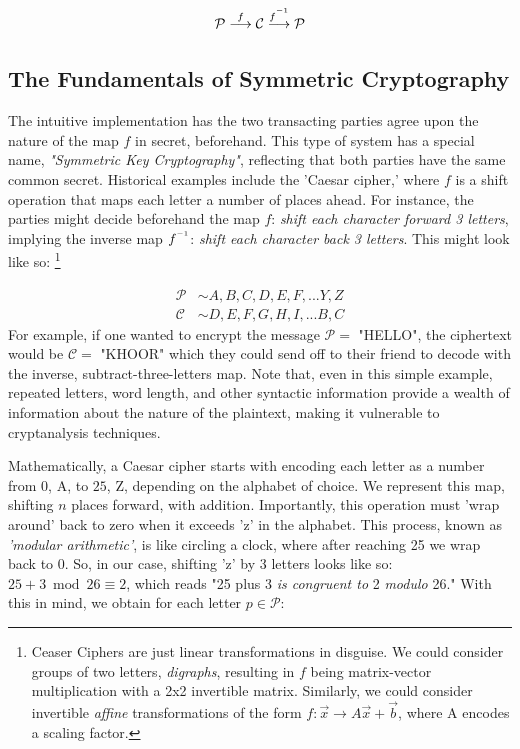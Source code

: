 \documentclass[11pt, a4paper]{report}
\newcommand{\inv}{^{\raisebox{.2em}{$\scriptscriptstyle-1$}}}
\begin{document}
$$ \mathcal{P} \overset{f}\longrightarrow \mathcal{C} \overset{f\inv}\longrightarrow \mathcal{P} $$

\subsection{The Fundamentals of Symmetric Cryptography}

The intuitive implementation has the two transacting parties agree upon the nature of the map $f$ in secret, beforehand. This type of system has a special name, \textit{"Symmetric Key Cryptography"}, reflecting that both parties have the same common secret. Historical examples include the 'Caesar cipher,' where $f$ is a shift operation that maps each letter a number of places ahead. For instance, the parties might decide beforehand the map $f$: \textit{shift each character forward 3 letters}, implying the inverse map $f\inv$: \textit{shift each character back 3 letters}. This might look like so: \footnote{Ceaser Ciphers are just linear transformations in disguise. We could consider groups of two letters, \textit{digraphs}, resulting in $f$ being matrix-vector multiplication with a 2x2 invertible matrix. Similarly, we could consider invertible \textit{affine} transformations of the form $f:\vec{x} \to A\vec{x} + \vec{b}$, where A encodes a scaling factor.}

\begin{align*}
 \mathcal{P} &\sim A,B,C,D,E,F,...Y,Z  \\ 
 \mathcal{C} &\sim D,E,F,G,H,I,...B,C 
\end{align*} %
For example, if one wanted to encrypt the message $\mathcal{P} =$ "HELLO", the ciphertext would be $\mathcal{C} =$ "KHOOR" which they could send off to their friend to decode with the inverse, subtract-three-letters map. Note that, even in this simple example, repeated letters, word length, and other syntactic information provide a wealth of information about the nature of the plaintext, making it vulnerable to cryptanalysis techniques.\autocite[56]{koblitz} 

Mathematically, a Caesar cipher starts with encoding each letter as a number from $0$, A, to $25$, Z, depending on the alphabet of choice. We represent this map, shifting $n$ places forward, with addition. Importantly, this operation must 'wrap around' back to zero when it exceeds 'z' in the alphabet. This process, known as \textit{'modular arithmetic'}, is like circling a clock, where after reaching 25 we wrap back to 0. So, in our case, shifting 'z' by 3 letters looks like so: $25 + 3 \bmod 26 \equiv 2$, which reads "25 plus 3 \textit{is congruent to} 2 \textit{modulo} 26." With this in mind, we obtain for each letter $p \in \mathcal{P}$:  
\end{document}
